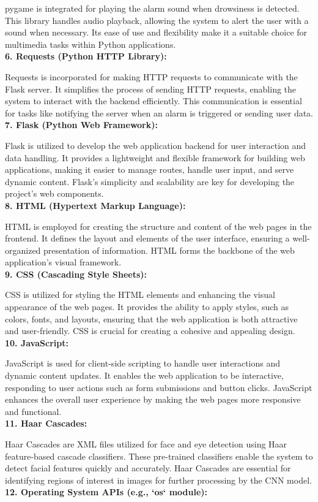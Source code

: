 \documentclass[12pt]{article}
\begin{document}
pygame is integrated for playing the alarm sound when drowsiness is detected. This library handles audio playback, allowing the system to alert the user with a sound when necessary. Its ease of use and flexibility make it a suitable choice for multimedia tasks within Python applications.\\
\textbf{6. Requests (Python HTTP Library):}

Requests is incorporated for making HTTP requests to communicate with the Flask server. It simplifies the process of sending HTTP requests, enabling the system to interact with the backend efficiently. This communication is essential for tasks like notifying the server when an alarm is triggered or sending user data.\\
\textbf{7. Flask (Python Web Framework):}

Flask is utilized to develop the web application backend for user interaction and data handling. It provides a lightweight and flexible framework for building web applications, making it easier to manage routes, handle user input, and serve dynamic content. Flask's simplicity and scalability are key for developing the project's web components.\\
\textbf{8. HTML (Hypertext Markup Language):}

HTML is employed for creating the structure and content of the web pages in the frontend. It defines the layout and elements of the user interface, ensuring a well-organized presentation of information. HTML forms the backbone of the web application's visual framework.\\
\textbf{9. CSS (Cascading Style Sheets):}

CSS is utilized for styling the HTML elements and enhancing the visual appearance of the web pages. It provides the ability to apply styles, such as colors, fonts, and layouts, ensuring that the web application is both attractive and user-friendly. CSS is crucial for creating a cohesive and appealing design.\\
\textbf{10. JavaScript:}

JavaScript is used for client-side scripting to handle user interactions and dynamic content updates. It enables the web application to be interactive, responding to user actions such as form submissions and button clicks. JavaScript enhances the overall user experience by making the web pages more responsive and functional.\\
\textbf{11. Haar Cascades:}

Haar Cascades are XML files utilized for face and eye detection using Haar feature-based cascade classifiers. These pre-trained classifiers enable the system to detect facial features quickly and accurately. Haar Cascades are essential for identifying regions of interest in images for further processing by the CNN model.\\
\textbf{12. Operating System APIs (e.g., `os` module):}
\end{document}
